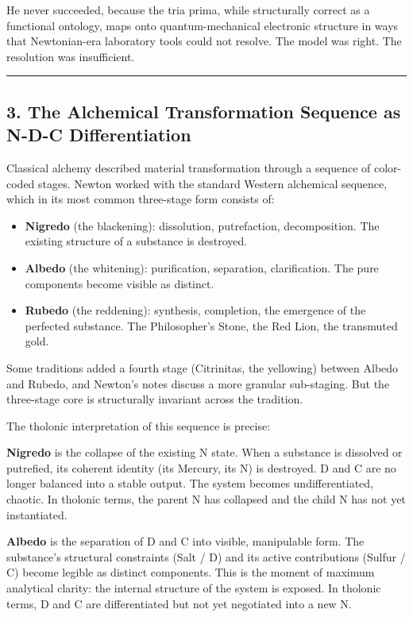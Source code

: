 \documentclass[
  11pt,
  letterpaper,
]{article}
\providecommand{\tightlist}{%
  \setlength{\itemsep}{0pt}\setlength{\parskip}{0pt}}
\begin{document}
He never succeeded, because the tria prima, while structurally correct
as a functional ontology, maps onto quantum-mechanical electronic
structure in ways that Newtonian-era laboratory tools could not resolve.
The model was right. The resolution was insufficient.

\begin{center}\rule{0.5\linewidth}{0.5pt}\end{center}

\subsection{3. The Alchemical Transformation Sequence as N-D-C
Differentiation}\label{the-alchemical-transformation-sequence-as-n-d-c-differentiation}

Classical alchemy described material transformation through a sequence
of color-coded stages. Newton worked with the standard Western
alchemical sequence, which in its most common three-stage form consists
of:

\begin{itemize}
\tightlist
\item
  \textbf{Nigredo} (the blackening): dissolution, putrefaction,
  decomposition. The existing structure of a substance is destroyed.
\item
  \textbf{Albedo} (the whitening): purification, separation,
  clarification. The pure components become visible as distinct.
\item
  \textbf{Rubedo} (the reddening): synthesis, completion, the emergence
  of the perfected substance. The Philosopher's Stone, the Red Lion, the
  transmuted gold.
\end{itemize}

Some traditions added a fourth stage (Citrinitas, the yellowing) between
Albedo and Rubedo, and Newton's notes discuss a more granular
sub-staging. But the three-stage core is structurally invariant across
the tradition.

The tholonic interpretation of this sequence is precise:

\textbf{Nigredo} is the collapse of the existing N state. When a
substance is dissolved or putrefied, its coherent identity (its Mercury,
its N) is destroyed. D and C are no longer balanced into a stable
output. The system becomes undifferentiated, chaotic. In tholonic terms,
the parent N has collapsed and the child N has not yet instantiated.

\textbf{Albedo} is the separation of D and C into visible, manipulable
form. The substance's structural constraints (Salt / D) and its active
contributions (Sulfur / C) become legible as distinct components. This
is the moment of maximum analytical clarity: the internal structure of
the system is exposed. In tholonic terms, D and C are differentiated but
not yet negotiated into a new N.
\end{document}
